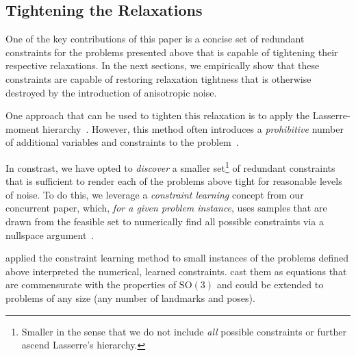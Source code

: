 \documentclass[lettersize,journal]{IEEEtran}
\newcommand{\rev}[1]{\color{red}{#1}\color{black}}
\begin{document}
\subsection{Tightening the Relaxations}\label{sec:Tightening}

One of the key contributions of this paper is a concise set of redundant constraints for the problems presented above that is capable of tightening their respective relaxations. In the next sections, we empirically show that these constraints are capable of restoring relaxation tightness that is otherwise destroyed by the introduction of anisotropic noise.

One approach that can be used to tighten this relaxation is to apply the Lasserre-moment hierarchy~\cite{henrionMomentSOSHierarchyLectures2021, lasserreGlobalOptimizationPolynomials2001}. However, this method often introduces a \emph{prohibitive} number of additional  variables and constraints to the problem~\cite{yangCertifiablyOptimalOutlierRobust2023}. 

In constrast, we have opted to \emph{discover} a smaller set\footnote{Smaller in the sense that we do not include \emph{all} possible constraints or further ascend Lasserre's hierarchy.} of redundant constraints that is sufficient to render each of the problems above tight for reasonable levels of noise.  To do this, we leverage a \emph{constraint learning} concept from our concurrent paper, which, \emph{for a given problem instance}, uses samples that are drawn from the feasible set to numerically find all possible constraints via a nullspace argument~\cite{dumbgenGloballyOptimalState2023a}. \rev{This constraint learning process can be time-consuming and it is not feasible to repeat it for each new problem instance.}

\rev{Therefore, we }applied the constraint learning method to small instances of the problems defined above \rev{and } interpreted the \rev{resulting } numerical, learned constraints. \rev{We then } cast them as equations that are commensurate with the properties of $\mbox{SO}(3)$ and could be extended to problems of any size (any number of landmarks and poses). 
\end{document}
